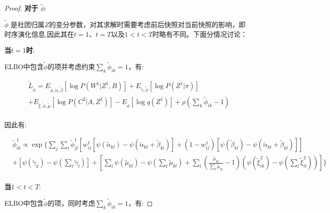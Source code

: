 \begin{proof}
	\textbf{对于 $\widetilde{\phi}$}:
	
	$\widetilde{\phi}$ 是社团归属$Z$的变分参数，对其求解时需要考虑前后快照对当前快照的影响，即时序演化信息,因此其在$t=1$、$t=T$以及$1<t<T$时略有不同。下面分情况讨论：
	
	\textbf{当$t=1$时}:
	
	ELBO中包含$\widetilde{\phi}$的项并考虑约束$\sum_k \widetilde{\phi}_{ik} = 1$，有:
	
	\begin{equation}
		\begin{split}
			&\widetilde{L}_{\widetilde{\phi}} = E_{\widetilde{\phi},\widetilde{\alpha},\widetilde{\beta}} [\log P(W^1|Z^1,B)] + E_{\widetilde{\gamma},\widetilde{\phi}}[\log P(Z^1|\pi)] \\
			&+ E_{\widetilde{\xi},\widetilde{\phi},\widetilde{\mu}}[\log P(C^2|A,Z^1)] - E_{\widetilde{\phi}}[\log q(Z^1)]+\rho (\sum_k \widetilde{\phi}_{ik}-1)\\
		\end{split}
	\end{equation}
	
	因此有:
	
	\begin{equation}
		\label{appendix:eq8}
		\begin{split}
			&\widetilde{\phi}_{ik}^1 \propto \exp\{\sum_j \sum_l \widetilde{\phi}_{jl}^1 [w_{ij}^1[\psi(\widetilde{\alpha}_{kl})-\psi(\widetilde{\alpha}_{kl}+\widetilde{\beta}_{kl})]
			+ (1-w_{ij}^1)[\psi(\widetilde{\beta}_{kl}) - \psi(\widetilde{\alpha}_{kl}+\widetilde{\beta}_{kl})] ]   \\
			& +[\psi(\widetilde{\gamma}_k)-\psi(\sum_l \widetilde{\gamma}_l) ] +[\sum_l \psi(\widetilde{\mu}_{kl}) - \psi(\sum_l \widetilde{\mu}_{kl}) 
			+ \sum_l (\frac{\widetilde{\mu}_{kl}}{\sum_l \widetilde{\mu}_{kl}}-1)(\psi (\widetilde{\xi}_{ik}^2) - \psi(\sum_l \widetilde{\xi}_{il}^2))]  \} \\
		\end{split}
	\end{equation}
	
	\textbf{当$1<t<T$}:
	
	ELBO中包含$\widetilde{\phi}$的项，同时考虑$\sum_k \widetilde{\phi}_{ik} = 1 $，有:
	

\end{proof}
